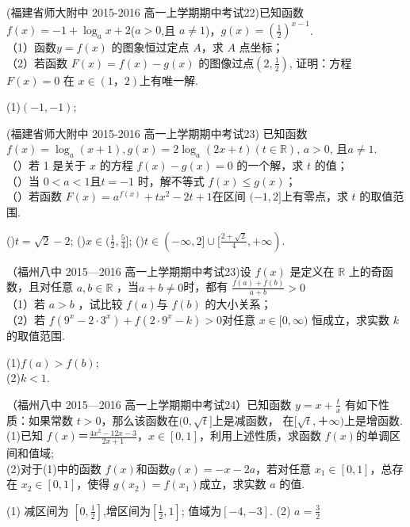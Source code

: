 \item (福建省师大附中 2015-2016 高一上学期期中考试22)已知函数$f(x)=-1+\log_a{x+2}$($a>0$,且 $a \neq1$)，$g(x)=(\frac12)^{x-1}$.\\
（1）函数$ y= f (x )$ 的图象恒过定点 $A$，求 $A$ 点坐标；\\
（2）若函数 $F ( x )= f ( x )- g ( x )$ 的图像过点$(2,\frac12)$, 证明：方程 $F ( x )= 0$ 在 $x\in(1，2)$上有唯一解.\\
\begin{answer}
(1)$(-1,-1)$;\\
\end{answer}

\item (福建省师大附中 2015-2016 高一上学期期中考试23) 已知函数 $f ( x ) =\log_a ( x+ 1), g ( x )= 2 \log_a ( 2 x+ t )(t\in \mathbb{R})$, $a> 0$, 且$a\neq 1$.\\
（）若 1 是关于 $x$ 的方程 $f ( x) -g ( x) =0$ 的一个解，求 $t$ 的值；\\
（）当 $0< a< 1$且$t=-1$ 时，解不等式 $f ( x)\leq g ( x) $；\\
（）若函数 $F ( x)= a^{f ( x ) }+ tx^2- 2t+ 1 $在区间 $(-1,2]$上有零点，求 $t$ 的取值范围.\\
\begin{answer}
()$t=\sqrt{2}-2$;
()$x\in(\frac12,\frac54]$;
()$t\in(-\infty,2]\cup [\frac{2+\sqrt{2}}{4},+\infty)$.
\end{answer}

\item
（福州八中 2015—2016 高一上学期期中考试23)设 $f (x )$ 是定义在 $\mathbb{R}$ 上的奇函数，且对任意 $a,b\in \mathbb{R}$ ，当$a+b\neq0$时，都有 $\frac{f(a)+f(b)}{a+b}>0$\\
（1）若 $a> b$ ，试比较 $f (a ) $与 $f (b)$ 的大小关系；\\
（2）若 $f (9^x- 2\cdot 3^x )+ f ( 2\cdot 9^x-k )> 0 $对任意 $x\in[0,\infty )$ 恒成立，求实数 $k$ 的取值范围.\\
\begin{answer}
(1)$f(a)>f(b)$;\\
(2)$k<1$.\\
\end{answer}

\item
（福州八中 2015—2016 高一上学期期中考试24）已知函数 $y=x+\frac tx$ 有如下性质：如果常数 $t>0$，那么该函数在$(0,\sqrt t]$上是减函数， 在$[\sqrt t, ＋\infty)$上是增函数.\\
(1)已知 $f(x)＝\frac{4x^2-12x-3}{2x+1} $，$x\in[0,1]$，利用上述性质，求函数 $f(x)$的单调区间和值域;\\
(2)对于(1)中的函数 $f(x)$和函数$g(x)=-x-2a$，若对任意 $x_1 \in[0,1]$，总存在 $x_2\in[0,1]$，使得 $g(x_2 )=f(x_1 ) $成立，求实数 $a$ 的值.\\
\begin{answer}
(1) 减区间为 $[0,\frac12] $,增区间为$[\frac12,1] $; 值域为$[-4,-3] $.
(2) $a=\frac32 $
\end{answer}

